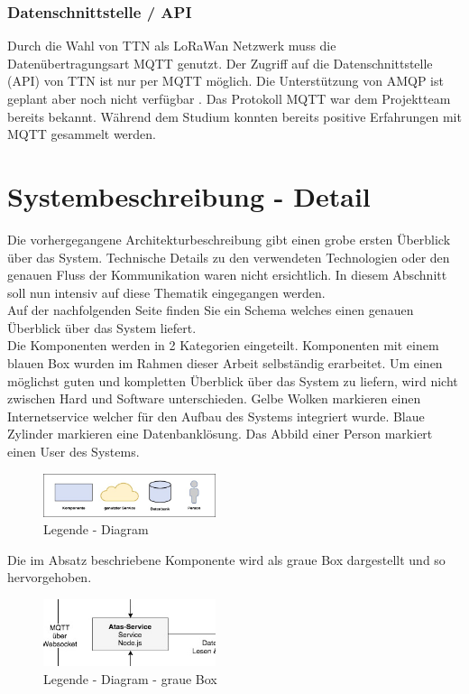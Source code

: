\documentclass[11pt,english,german]{report}
\theoremstyle{definition}
\begin{document}
\subsection{Datenschnittstelle / API}
Durch die Wahl von TTN als LoRaWan Netzwerk muss die Datenübertragungsart MQTT genutzt. Der Zugriff auf die Datenschnittstelle (API) von TTN ist nur per MQTT möglich. Die Unterstützung von AMQP ist geplant aber noch nicht verfügbar \cite{amqp}. Das Protokoll MQTT war dem Projektteam bereits bekannt. Während dem Studium konnten bereits positive Erfahrungen mit MQTT gesammelt werden.

\chapter{Systembeschreibung - Detail}
Die vorhergegangene Architekturbeschreibung gibt einen grobe ersten Überblick über das System. Technische Details zu  den verwendeten Technologien oder den genauen Fluss der Kommunikation waren nicht ersichtlich. In diesem Abschnitt soll nun intensiv auf diese Thematik eingegangen werden.\\[0.3cm]
Auf der nachfolgenden Seite finden Sie ein Schema welches einen genauen Überblick über das System liefert.\\[0.3cm]
Die Komponenten werden in 2 Kategorien eingeteilt. Komponenten mit einem blauen Box wurden im Rahmen dieser Arbeit selbständig erarbeitet. Um einen möglichst guten und kompletten Überblick über das System zu liefern, wird nicht zwischen Hard und Software unterschieden. Gelbe Wolken markieren einen Internetservice welcher für den Aufbau des Systems integriert wurde. Blaue Zylinder markieren eine Datenbanklösung. Das Abbild einer Person markiert einen User des Systems.

\begin{figure}[H]
	\centering
	\includegraphics[width=0.45\textwidth]{img/system/legend.jpg}
	\caption[Legende - Diagram]
	{Legende - Diagram}
\end{figure}

\noindent
Die im Absatz beschriebene Komponente wird als graue Box dargestellt und so hervorgehoben.
\begin{figure}[H]
	\centering
	\includegraphics[width=0.45\textwidth]{img/system/greybox.jpg}
	\caption[Legende - Diagram - graue Box]
	{Legende - Diagram - graue Box}
\end{figure}
\end{document}
